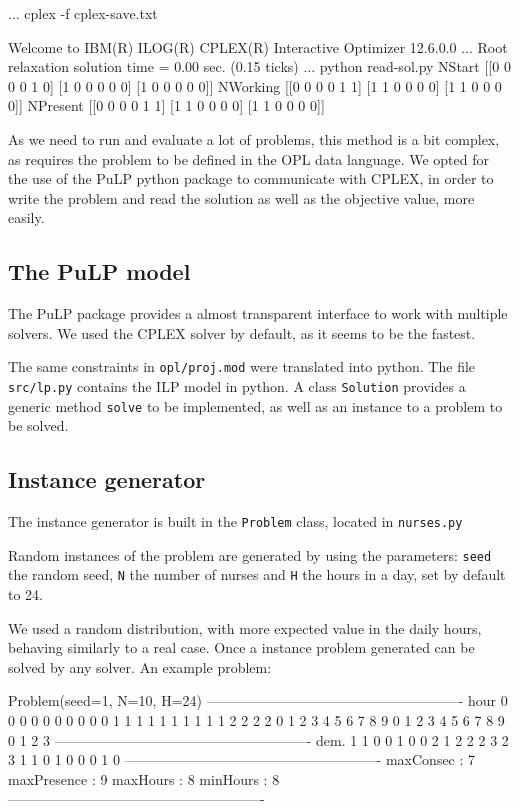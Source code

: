 \documentclass[12pt,a4paper]{article}
\begin{document}
\begin{textcode}
...
cplex -f cplex-save.txt

Welcome to IBM(R) ILOG(R) CPLEX(R) Interactive Optimizer 12.6.0.0
...
Root relaxation solution time = 0.00 sec. (0.15 ticks)
...
python read-sol.py
NStart
[[0 0 0 0 1 0]
 [1 0 0 0 0 0]
 [1 0 0 0 0 0]]
NWorking
[[0 0 0 0 1 1]
 [1 1 0 0 0 0]
 [1 1 0 0 0 0]]
NPresent
[[0 0 0 0 1 1]
 [1 1 0 0 0 0]
 [1 1 0 0 0 0]]
\end{textcode}

As we need to run and evaluate a lot of problems, this method is a bit complex, 
as requires the problem to be defined in the OPL data language.  We opted for 
the use of the PuLP python package to communicate with CPLEX, in order to write 
the problem and read the solution as well as the objective value, more easily.

\subsection{The PuLP model}

The PuLP package provides a almost transparent interface to work with multiple 
solvers. We used the CPLEX solver by default, as it seems to be the fastest.

The same constraints in \texttt{opl/proj.mod} were translated into python. The 
file \texttt{src/lp.py} contains the ILP model in python. A class 
\texttt{Solution} provides a generic method \texttt{solve} to be implemented, as 
well as an instance to a problem to be solved.

\subsection{Instance generator}

The instance generator is built in the \texttt{Problem} class, located in 
\texttt{nurses.py}

Random instances of the problem are generated by using the parameters: 
\texttt{seed} the random seed, \texttt{N} the number of nurses and \texttt{H} 
the hours in a day, set by default to 24.

We used a random distribution, with more expected value in the daily hours, 
behaving similarly to a real case. Once a instance problem generated can be 
solved by any solver. An example problem:

\begin{textcode}
Problem(seed=1, N=10, H=24)
-------------------------------------------------------
hour  0 0 0 0 0 0 0 0 0 0 1 1 1 1 1 1 1 1 1 1 2 2 2 2 
      0 1 2 3 4 5 6 7 8 9 0 1 2 3 4 5 6 7 8 9 0 1 2 3 
-------------------------------------------------------
dem.  1 1 0 0 1 0 0 2 1 2 2 2 3 2 3 1 1 0 1 0 0 0 1 0 
-------------------------------------------------------
 maxConsec   : 7
 maxPresence : 9
 maxHours    : 8
 minHours    : 8
-------------------------------------------------------
\end{textcode}
\end{document}
